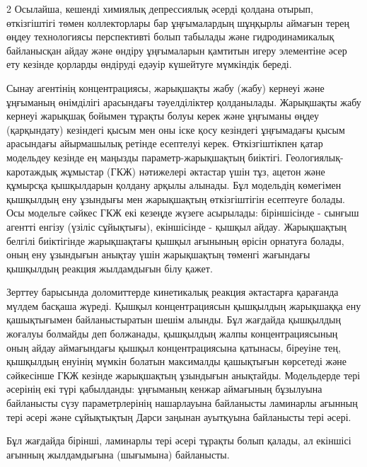 \begin{multicols}{2}
Осылайша, кешенді химиялық депрессиялық әсерді қолдана отырып,
өткізгіштігі төмен коллекторлары бар ұңғымалардың шұңқырлы аймағын терең
өңдеу технологиясы перспективті болып табылады және гидродинамикалық
байланысқан айдау және өндіру ұңғымаларын қамтитын игеру элементіне әсер
ету кезінде қорларды өндіруді едәуір күшейтуге мүмкіндік береді.

Сынау агентінің концентрациясы, жарықшақты жабу (жабу) кернеуі және
ұңғыманың өнімділігі арасындағы тәуелділіктер қолданылады. Жарықшақты
жабу кернеуі жарықшақ бойымен тұрақты болуы керек және ұңғыманы өңдеу
(қарқындату) кезіндегі қысым мен оны іске қосу кезіндегі ұңғымадағы
қысым арасындағы айырмашылық ретінде есептелуі керек. Өткізгіштікпен
қатар модельдеу кезінде ең маңызды параметр-жарықшақтың биіктігі.
Геологиялық-каротаждық жұмыстар (ГКЖ) нәтижелері әктастар үшін тұз,
ацетон және құмырсқа қышқылдарын қолдану арқылы алынады. Бұл модельдің
көмегімен қышқылдың ену ұзындығы мен жарықшақтың өткізгіштігін есептеуге
болады. Осы модельге сәйкес ГКЖ екі кезеңде жүзеге асырылады:
біріншісінде - сынғыш агентті енгізу (үзіліс сұйықтығы), екіншісінде -
қышқыл айдау. Жарықшақтың белгілі биіктігінде жарықшақтағы қышқыл
ағынының өрісін орнатуға болады, оның ену ұзындығын анықтау үшін
жарықшақтың төменгі жағындағы қышқылдың реакция жылдамдығын білу қажет.

Зерттеу барысында доломиттерде кинетикалық реакция әктастарға қарағанда
мүлдем басқаша жүреді. Қышқыл концентрациясын қышқылдың жарықшаққа ену
қашықтығымен байланыстыратын шешім алынды. Бұл жағдайда қышқылдың
жоғалуы болмайды деп болжанады, қышқылдың жалпы концентрациясының оның
айдау аймағындағы қышқыл концентрациясына қатынасы, біреуіне тең,
қышқылдың енуінің мүмкін болатын максималды қашықтығын көрсетеді және
сәйкесінше ГКЖ кезінде жарықшақтың ұзындығын анықтайды. Модельдерде тері
әсерінің екі түрі қабылданды: ұңғыманың кенжар аймағының бұзылуына
байланысты сүзу параметрлерінің нашарлауына байланысты ламинарлы ағынның
тері әсері және сұйықтықтың Дарси заңынан ауытқуына байланысты тері
әсері.

Бұл жағдайда бірінші, ламинарлы тері әсері тұрақты болып қалады, ал
екіншісі ағынның жылдамдығына (шығымына) байланысты.


\end{multicols}
